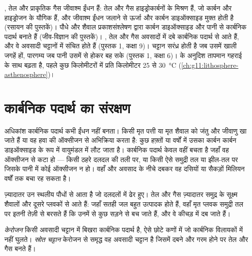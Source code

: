 \begin{recall}
, तेल और प्राकृतिक गैस जीवाश्म ईंधन हैं: तेल और गैस
हाइड्रोकार्बनों के मिश्रण हैं, जो कार्बन और हाइड्रोजन के यौगिक हैं, और जीवाश्म ईंधन जलाने से
ऊर्जा और कार्बन डाइऑक्साइड मुक्त होती है (रसायन की पुस्तकें)। पौधे और शैवाल
प्रकाशसंश्लेषण द्वारा कार्बन डाइऑक्साइड और पानी से कार्बनिक पदार्थ बनाते हैं (जीव-विज्ञान
की पुस्तकें)। , तेल और गैस अवसादों में दबे कार्बनिक पदार्थ से आते हैं,
और वे अवसादी चट्टानों में संचित होते हैं (पुस्तक 1, कक्षा 9)। चट्टान
सरंध्र होती है जब उसमें खाली जगहें हों, पारगम्य जब पानी उसमें से होकर बह सके
(पुस्तक 1, कक्षा 6)।  के अनुदिश तापमान गहराई के साथ बढ़ता है,
पहले कुछ किलोमीटरों में प्रति किलोमीटर 25 से \qty{30}{\degreeCelsius}
(\cref{ch:g11:lithosphere-asthenosphere})।
\end{recall}

\section{कार्बनिक पदार्थ का संरक्षण}

अधिकांश कार्बनिक पदार्थ कभी ईंधन नहीं बनता। किसी मृत पत्ती या मृत शैवाल को
जंतु और जीवाणु खा जाते हैं या वह हवा की ऑक्सीजन से अभिक्रिया करता है: कुछ
हफ़्तों या वर्षों में उसका कार्बन कार्बन डाइऑक्साइड के रूप में वायुमंडल में लौट जाता है।
कार्बनिक पदार्थ केवल वहीं बचता है जहाँ वह ऑक्सीजन से कटा हो --- किसी
ठहरे दलदल की तली पर, या किसी ऐसे समुद्री तल या झील-तल पर जिसके पानी में
कोई ऑक्सीजन न हो। वहाँ और अवसाद के नीचे दबकर वह दसियों या
सैकड़ों मिलियन वर्षों तक बचा रह सकता है।

 ज़्यादातर उन स्थलीय पौधों से आता है जो दलदलों में ढेर हुए। तेल और गैस
ज़्यादातर समुद्र के सूक्ष्म शैवालों और दूसरे प्लवकों से आते हैं: जहाँ
सतही जल बहुत उत्पादक होते हैं, वहाँ मृत प्लवक समुद्री तल पर
इतनी तेज़ी से बरसते हैं कि उनमें से कुछ सड़ने से बच जाते हैं, और वे कीचड़ में दब जाते हैं।

\begin{definition}[स्रोत चट्टान; केरोजन]\label{def:g11:fossil-fuel-geology:source-rock}
\emph{केरोजन} किसी अवसादी चट्टान में बिखरा कार्बनिक पदार्थ है,
ऐसे छोटे कणों में जो कार्बनिक विलायकों में नहीं घुलते।
\emph{स्रोत चट्टान} केरोजन से समृद्ध वह अवसादी चट्टान है
जिसमें दबने और गरम होने पर तेल और गैस बनते हैं।
\end{definition}

